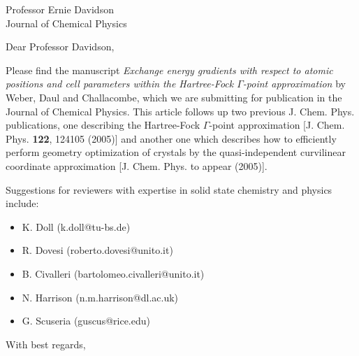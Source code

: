 
\pagestyle{empty}

\signature{V. Weber}

\address{
V. Weber \\
(valeryw@lanl.gov) \\
Theoretical Division \\
Group T-12, MS B268 \\
Los Alamos National Laboratory \\
Los Alamos, NM 87545 }

\date{November 30, 2005}

\begin{letter}{
Professor Ernie Davidson\\
Journal of Chemical Physics
}

\opening{Dear Professor Davidson,}

Please find the manuscript {\em Exchange energy gradients with respect 
to atomic positions and cell parameters within the Hartree-Fock 
$\Gamma$-point approximation} by Weber, Daul and Challacombe, which we are 
submitting for publication in the Journal of Chemical Physics. 
This article follows up two previous J. Chem. Phys. publications, one 
describing the Hartree-Fock $\Gamma$-point approximation [J. Chem. Phys. {\bf 122}, 124105 (2005)] 
and another one which describes how to efficiently perform geometry optimization of crystals by the 
quasi-independent curvilinear coordinate approximation [J. Chem. Phys. to appear (2005)].

Suggestions for reviewers with expertise in solid state chemistry and physics include: 
\begin{itemize}
\item K. Doll (k.doll@tu-bs.de)
\item R. Dovesi (roberto.dovesi@unito.it)
\item B. Civalleri (bartolomeo.civalleri@unito.it)
\item N. Harrison (n.m.harrison@dl.ac.uk)
\item G. Scuseria (guscus@rice.edu)
\end{itemize}


\closing{With best regards,}
\end{letter}

